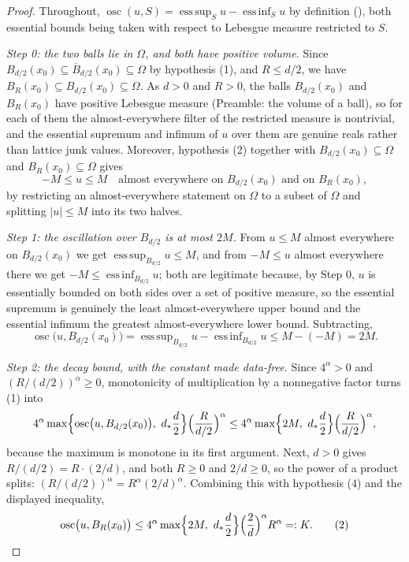 \begin{proof}
Throughout, $\operatorname*{osc}(u,S)
=\operatorname{ess\,sup}_Su-\operatorname{ess\,inf}_Su$ by definition
(), both essential bounds being taken with respect to
Lebesgue measure restricted to $S$.

\emph{Step 0: the two balls lie in $\Omega$, and both have positive volume.}
Since $B_{d/2}(x_0)\subseteq\overline B_{d/2}(x_0)\subseteq\Omega$ by
hypothesis (1), and $R\le d/2$, we have
$B_R(x_0)\subseteq B_{d/2}(x_0)\subseteq\Omega$.  As $d>0$ and $R>0$, the balls
$B_{d/2}(x_0)$ and $B_R(x_0)$ have positive Lebesgue measure (Preamble: the
volume of a ball), so for each of them the almost-everywhere filter of the
restricted measure is nontrivial, and the essential supremum and infimum of
$u$ over them are genuine reals rather than lattice junk values.  Moreover,
hypothesis (2) together with $B_{d/2}(x_0)\subseteq\Omega$ and
$B_R(x_0)\subseteq\Omega$ gives
\[
-M\le u\le M\quad\text{almost everywhere on }B_{d/2}(x_0)\text{ and on }B_R(x_0),
\]
by restricting an almost-everywhere statement on $\Omega$ to a subset of
$\Omega$ and splitting $|u|\le M$ into its two halves.

\emph{Step 1: the oscillation over $B_{d/2}$ is at most $2M$.}  From
$u\le M$ almost everywhere on $B_{d/2}(x_0)$ we get
$\operatorname{ess\,sup}_{B_{d/2}}u\le M$, and from $-M\le u$ almost
everywhere there we get $-M\le\operatorname{ess\,inf}_{B_{d/2}}u$; both are
legitimate because, by Step 0, $u$ is essentially bounded on both sides over a
set of positive measure, so the essential supremum is genuinely the least
almost-everywhere upper bound and the essential infimum the greatest
almost-everywhere lower bound.  Subtracting,
\[
\operatorname*{osc}\bigl(u,B_{d/2}(x_0)\bigr)
=\operatorname{ess\,sup}_{B_{d/2}}u-\operatorname{ess\,inf}_{B_{d/2}}u
\le M-(-M)=2M.
\tag{1}
\]

\emph{Step 2: the decay bound, with the constant made data-free.}  Since
$4^{\alpha}>0$ and $(R/(d/2))^{\alpha}\ge0$, monotonicity of multiplication by
a nonnegative factor turns (1) into
\[
4^{\alpha}\max\Bigl\{\operatorname*{osc}\bigl(u,B_{d/2}(x_0)\bigr),\
d_\ast\frac d2\Bigr\}\Bigl(\frac{R}{d/2}\Bigr)^{\alpha}
\le4^{\alpha}\max\Bigl\{2M,\ d_\ast\frac d2\Bigr\}
  \Bigl(\frac{R}{d/2}\Bigr)^{\alpha},
\]
because the maximum is monotone in its first argument.  Next, $d>0$ gives
$R/(d/2)=R\cdot(2/d)$, and both $R\ge0$ and $2/d\ge0$, so the power of a
product splits:
$(R/(d/2))^{\alpha}=R^{\alpha}(2/d)^{\alpha}$.  Combining this with
hypothesis (4) and the displayed inequality,
\[
\operatorname*{osc}\bigl(u,B_R(x_0)\bigr)
\le4^{\alpha}\max\Bigl\{2M,\ d_\ast\frac d2\Bigr\}
  \Bigl(\frac2d\Bigr)^{\alpha}R^{\alpha}=:K .
\tag{2}
\]


\end{proof}

